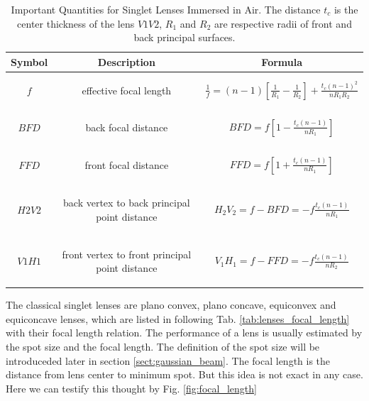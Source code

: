 \begin{table}[!ht]
\centering
\caption{Important Quantities for Singlet Lenses Immersed in Air. The distance $t_{c}$ is the center thickness of the lens $V1V2$,  $R_{1}$ and $R_{2}$ are respective radii of front and back principal surfaces\cite{lens_theory_LC_Ltd}.}
\begin{tabular}{|c|c|c|}
\hline
\textbf{Symbol}&\textbf{Description}&\textbf{Formula}\\
\hline
$f$ & \parbox[c]{6cm}{
						\begin{center}
						effective focal length
						\end{center}
				}& $\frac{1}{f}=(n-1)\left[\frac{1}{R_{1}}-\frac{1}{R_{2}} \right]+\frac{t_{c}(n-1)^2}{nR_{1}R_{2}}$ \\
\hline
$BFD$ &\parbox[c]{6cm}{
						\begin{center}
						back focal distance 
						\end{center}
			}& $BFD=f\left[ 1-\frac{t_{c}(n-1)}{nR_{1}}\right]$ \\
\hline
$FFD$ &\parbox[c]{6cm}{
						\begin{center}
						 front focal distance
						 \end{center} 
			}& $FFD=f\left[ 1+\frac{t_{c}(n-1)}{nR_{1}}\right]$ \\
\hline
$H2V2$ & \parbox[c]{6cm}{
						\begin{center}
						back vertex to back principal point distance
						\end{center}						
			} & $H_{2}V_{2}=f-BFD=-f\frac{t_{c}(n-1)}{nR_{1}}$ \\
\hline
$V1H1$ & \parbox[c]{6cm}{
						\begin{center}			
				    front vertex to front principal point distance
				    \end{center}
				 } & $V_{1}H_{1}=f-FFD=-f\frac{t_{c}(n-1)}{nR_{2}}$ \\
\hline
\end{tabular}
\label{tab:lens_quantities}
\end{table}
The classical singlet lenses are plano convex, plano concave, equiconvex and equiconcave lenses, which are listed in following Tab. \ref{tab:lenses_focal_length} with their focal length relation. The performance of a lens is usually estimated by the spot size and the focal length. The definition of the spot size will be introduceded later in section \ref{sect:gaussian_beam}. The focal length is the distance from lens center to minimum spot. But this idea is not exact in any case.  Here we can testify this thought by Fig. \ref{fig:focal_length} \\

